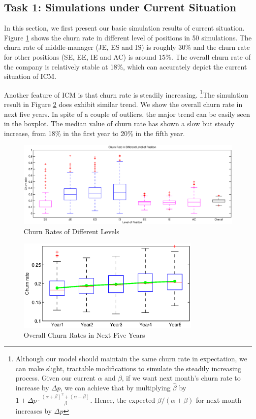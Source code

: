 \documentclass[tcn = 37075, sheet = false, abstract = false]{mcmthesis}
\begin{document}
	\subsection{Task 1: Simulations under Current Situation}
	
	In this section, we first present our basic simulation results of current situation. Figure \ref{fig:cdl} shows the churn rate in different level of positions in 50 simulations. The churn rate of middle-manager (JE, ES and IS) is roughly 30\% and the churn rate for other positions (SE, EE, IE and AC) is around 15\%. The overall churn rate of the company is relatively stable at 18\%, which can accurately depict the current situation of ICM.
	
	Another feature of ICM is that churn rate is steadily increasing. \footnote{Although our model should maintain the same churn rate in expectation, we can make slight, tractable modifications to simulate the steadily increasing process. Given our current $\alpha$ and $\beta$, if we want next month's churn rate to increase by $\Delta p$, we can achieve that by multiplying $\hat{\beta}$ by  $1 + \Delta p \cdot \frac{(\alpha+\beta)^2+(\alpha+\beta)}{\beta}$. Hence, the expected $\beta / (\alpha + \beta)$ for next month increases by $\Delta p$}The simulation result in Figure \ref{fig:cnf} does exhibit similar trend. We show the overall churn rate in next five years. In spite of a couple of outliers, the major trend can be easily seen in the boxplot. The median value of churn rate has shown a slow but steady increase, from 18\% in the first year to 20\% in the fifth year.
	
	\begin{figure}[htb!]
		\includegraphics[width=16cm]{figures/task1_2.eps}
		\caption{Churn Rates of Different Levels} 
		\label{fig:cdl}
	\end{figure}
	
	\begin{figure}[htb!]
		\centering
		\includegraphics[width=9cm]{figures/task1.eps}
		\caption{Overall Churn Rates in Next Five Years} 
		\label{fig:cnf}
	\end{figure}
	
\end{document}
